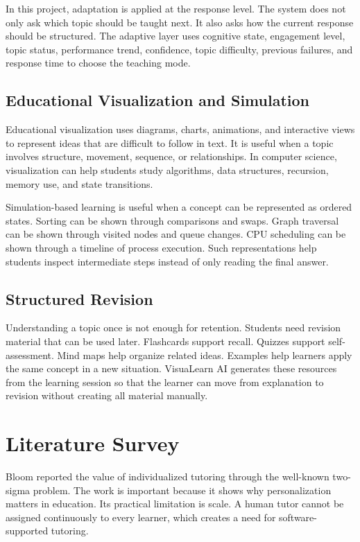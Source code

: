 In this project, adaptation is applied at the response level. The system does not only ask which topic should be taught next. It also asks how the current response should be structured. The adaptive layer uses cognitive state, engagement level, topic status, performance trend, confidence, topic difficulty, previous failures, and response time to choose the teaching mode.

\subsection[Educational Visualization and Simulation]{\textbf{Educational Visualization and Simulation}}

Educational visualization uses diagrams, charts, animations, and interactive views to represent ideas that are difficult to follow in text. It is useful when a topic involves structure, movement, sequence, or relationships. In computer science, visualization can help students study algorithms, data structures, recursion, memory use, and state transitions.

Simulation-based learning is useful when a concept can be represented as ordered states. Sorting can be shown through comparisons and swaps. Graph traversal can be shown through visited nodes and queue changes. CPU scheduling can be shown through a timeline of process execution. Such representations help students inspect intermediate steps instead of only reading the final answer.

\subsection[Structured Revision]{\textbf{Structured Revision}}

Understanding a topic once is not enough for retention. Students need revision material that can be used later. Flashcards support recall. Quizzes support self-assessment. Mind maps help organize related ideas. Examples help learners apply the same concept in a new situation. VisuaLearn AI generates these resources from the learning session so that the learner can move from explanation to revision without creating all material manually.

\section[Literature Survey]{\textbf{Literature Survey}}

Bloom \cite{Bloom1984} reported the value of individualized tutoring through the well-known two-sigma problem. The work is important because it shows why personalization matters in education. Its practical limitation is scale. A human tutor cannot be assigned continuously to every learner, which creates a need for software-supported tutoring.

